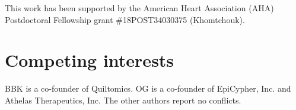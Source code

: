 \documentclass[letter]{bioinfo}
\begin{document}
	This work has been supported by the American Heart Association (AHA) Postdoctoral Fellowship grant \#18POST34030375 (Khomtchouk).\vspace*{-12pt}
	
	\section*{Competing interests}
	
	BBK is a co-founder of Quiltomics.  OG is a co-founder of EpiCypher, Inc. and Athelas Therapeutics, Inc.  The other authors report no conflicts.\vspace*{-12pt} 
	
	
	
	
	
	
\end{document}
